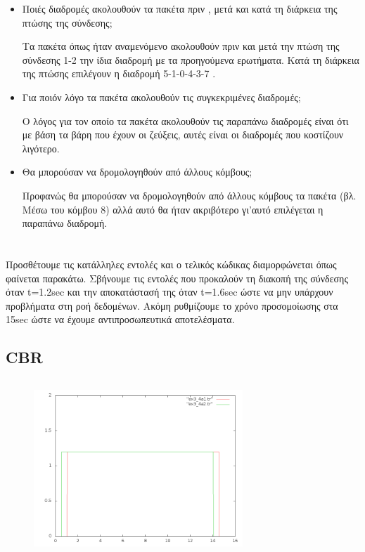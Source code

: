 \documentclass[a4paper,9pt]{article}
\begin{document}
\begin{itemize}
    \item Ποιές διαδρομές ακολουθούν τα πακέτα πριν , μετά και κατά τη διάρκεια της
        πτώσης της σύνδεσης;

        Τα πακέτα όπως ήταν αναμενόμενο ακολουθούν πριν και μετά την πτώση της
        σύνδεσης 1-2 την ίδια διαδρομή με τα προηγούμενα ερωτήματα. Κατά τη διάρκεια
        της πτώσης επιλέγουν η διαδρομή 5-1-0-4-3-7 .

    \item Για ποιόν λόγο τα πακέτα ακολουθούν τις συγκεκριμένες διαδρομές;

        Ο λόγος για τον οποίο τα πακέτα ακολουθούν τις παραπάνω διαδρομές είναι ότι με
        βάση τα βάρη που έχουν οι ζεύξεις, αυτές είναι οι διαδρομές που κοστίζουν
        λιγότερο.

    \item Θα μπορούσαν να δρομολογηθούν από άλλους κόμβους;

        Προφανώς θα μπορούσαν να δρομολογηθούν από άλλους κόμβους τα πακέτα (βλ. Μέσω
        του κόμβου 8) αλλά αυτό θα ήταν ακριβότερο γι’αυτό επιλέγεται η παραπάνω
        διαδρομή.
\end{itemize}



\section{}


Προσθέτουμε τις κατάλληλες εντολές και ο τελικός κώδικας διαμορφώνεται όπως
φαίνεται παρακάτω. Σβήνουμε τις εντολές που προκαλούν τη διακοπή της σύνδεσης
όταν t=1.2sec  και την αποκατάστασή της όταν t=1.6sec ώστε να μην υπάρχουν
προβλήματα στη ροή δεδομένων. Ακόμη ρυθμίζουμε το χρόνο προσομοίωσης στα 15sec
ώστε να έχουμε αντιπροσωπευτικά αποτελέσματα.

\subsection{CBR}
\inputminted[fontsize=\footnotesize]{tcl}{files/ex3_4a1.tcl}

\begin{figure}[H]
    \centering
    \includegraphics[width=0.7\textwidth]{files/graph1.png}
\end{figure}
\end{document}
